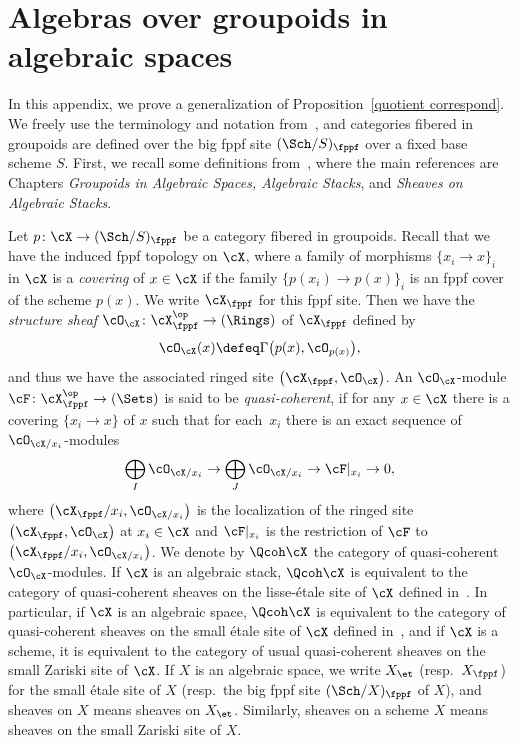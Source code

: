 \appendix

\section{Algebras over groupoids in algebraic spaces}\label{appendix}

In this appendix, we prove a generalization of Proposition~\ref{quotient correspond}. We freely use the terminology and notation from~\cite{stacks}, and categories fibered in groupoids are defined over the big fppf site $(\Sch/S)_{\fppf}$ over a fixed base scheme $S$. First, we recall some definitions from~\cite{stacks}, where the main references are Chapters {\it Groupoids in Algebraic Spaces, Algebraic Stacks}, and {\it Sheaves on Algebraic Stacks}.

Let $p\colon \cX\to (\Sch/S)_{\fppf}$ be a category fibered in groupoids. Recall that we have the induced fppf topology on $\cX$, where a family of morphisms $\{x_i\to x\}_{i}$ in $\cX$ is a {\it covering} of $x\in \cX$ if the family $\{ p(x_i)\to p(x)\}_i$ is an fppf cover of the scheme $p(x)$. We write $\cX_{\fppf}$ for this fppf site. Then we have the {\it structure sheaf} $\cO_{\cX}\colon \cX_{\fppf}^{\op}\to (\Rings)$ of $\cX_{\fppf}$ defined by
\begin{gather*}
\cO_{\cX}(x)\defeq\Gamma\big(p(x),\cO_{p(x)}\big),
\end{gather*}
and thus we have the associated ringed site $\big(\cX_{\fppf},\cO_{\cX}\big)$. An $\cO_{\cX}$-module $\cF\colon\cX_{\fppf}^{\op}\to (\Sets)$ is said to be {\it quasi-coherent}, if for any $x\in \cX$ there is a covering $\{x_i\to x\}$ of $x$ such that for each~$x_i$ there is an exact sequence of $\cO_{\cX/x_i}$-modules
\begin{gather*}
\bigoplus_{I}\cO_{\cX/x_i}\to \bigoplus_{J}\cO_{\cX/x_i}\to\cF|_{x_i}\to 0,
\end{gather*}
 where $\big(\cX_{\fppf}/x_i,\cO_{\cX/x_i}\big)$ is the localization of the ringed site $\big(\cX_{\fppf},\cO_{\cX}\big)$ at $x_i\in\cX$ and $\cF|_{x_i}$ is the restriction of $\cF$ to $\big(\cX_{\fppf}/x_i,\cO_{\cX/x_i}\big)$. We denote by $\Qcoh \cX$ the category of quasi-coherent $\cO_{\cX}$-modules. If $\cX$ is an algebraic stack, $\Qcoh \cX$ is equivalent to the category of quasi-coherent sheaves on the lisse-\'etale site of $\cX$ defined in~\cite[Definition 9.1.14]{olsson}. In particular, if $\cX$ is an algebraic space, $\Qcoh \cX$ is equivalent to the category of quasi-coherent sheaves on the small \'etale site of $\cX$ defined in~\cite[Definition 7.1.5]{olsson}, and if $\cX$ is a scheme, it is equivalent to the category of usual quasi-coherent sheaves on the small Zariski site of $\cX$. If $X$ is an algebraic space, we write $X_{\et}$ (resp.\ $X_{\fppf}$) for the small \'etale site of $X$ (resp.\ the big fppf site $(\Sch/X)_{\fppf}$ of $X$), and sheaves on $X$ means sheaves on $X_{\et}$. Similarly, sheaves on a scheme $X$ means sheaves on the small Zariski site of $X$.


